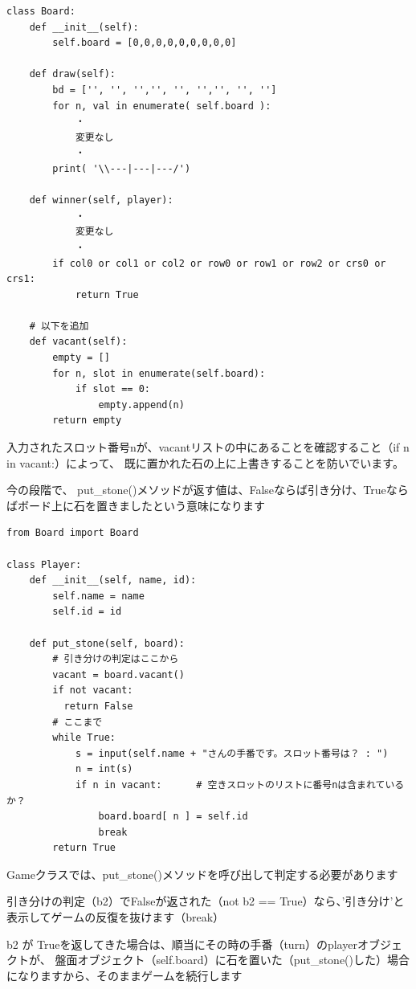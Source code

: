 \documentclass[uplatex,a4paper,11pt,oneside,openany]{jsbook}
\begin{document}
\begin{lstlisting}[caption=class Board,label=prog03-5]
class Board:
    def __init__(self):
        self.board = [0,0,0,0,0,0,0,0,0]

    def draw(self):
        bd = ['', '', '','', '', '','', '', '']
        for n, val in enumerate( self.board ):
            ・
            変更なし
            ・
        print( '\\---|---|---/')

    def winner(self, player):
            ・
            変更なし
            ・
        if col0 or col1 or col2 or row0 or row1 or row2 or crs0 or crs1:
            return True

    # 以下を追加
    def vacant(self):
        empty = []
        for n, slot in enumerate(self.board):
            if slot == 0:
                empty.append(n)
        return empty
\end{lstlisting}%

入力されたスロット番号nが、vacantリストの中にあることを確認すること（if n in vacant:）によって、
既に置かれた石の上に上書きすることを防いでいます。

今の段階で、
put\_stone()メソッドが返す値は、Falseならば引き分け、Trueならばボード上に石を置きましたという意味になります

\begin{lstlisting}[caption=class Player,label=prog03-3]
from Board import Board

class Player:
    def __init__(self, name, id):
        self.name = name
        self.id = id

    def put_stone(self, board):
        # 引き分けの判定はここから
        vacant = board.vacant()
        if not vacant:
          return False
        # ここまで
        while True:
            s = input(self.name + "さんの手番です。スロット番号は？ : ")
            n = int(s)
            if n in vacant:      # 空きスロットのリストに番号nは含まれているか？
                board.board[ n ] = self.id
                break
        return True
\end{lstlisting}%

Gameクラスでは、put\_stone()メソッドを呼び出して判定する必要があります

引き分けの判定（b2）でFalseが返された（not b2 == True）なら、'引き分け'と表示してゲームの反復を抜けます（break）

b2 が Trueを返してきた場合は、順当にその時の手番（turn）のplayerオブジェクトが、
盤面オブジェクト（self.board）に石を置いた（put\_stone()した）場合になりますから、そのままゲームを続行します
\end{document}
